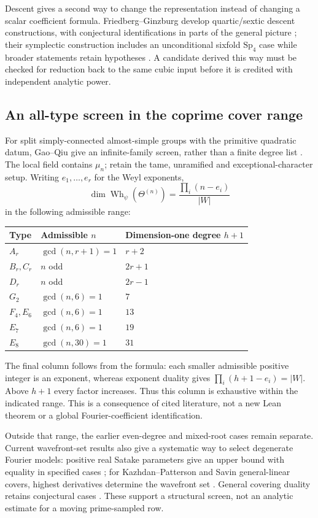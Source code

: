 \documentclass[11pt]{article}
\newcommand{\toprule}{\hline}
\newcommand{\midrule}{\hline}
\newcommand{\bottomrule}{\hline}
\newcommand{\Sp}{\mathrm{Sp}}
\begin{document}
Descent gives a second way to change the representation instead of
changing a scalar coefficient formula. Friedberg--Ginzburg develop
quartic/sextic descent constructions, with conjectural identifications
in parts of the general picture \cite{FGDescent}; their symplectic
construction includes an unconditional sixfold $\Sp_4$ case while
broader statements retain hypotheses \cite{FGSymplectic}.
A candidate derived this way must be checked for reduction back to the
same cubic input before it is credited with independent analytic power.

\subsection{An all-type screen in the coprime cover range}

For split simply-connected almost-simple groups with the primitive
quadratic datum, Gao--Qiu
give an infinite-family screen, rather than a finite degree list
\cite[Section 3, Table 6, (3.5)]{GaoQiu}. The local field contains
$\mu_n$; retain the tame, unramified and exceptional-character setup.
Writing $e_1,\ldots,e_r$ for the Weyl exponents,
\[
 \dim\operatorname{Wh}_{\psi}(\Theta^{(n)})
   =\frac{\prod_i(n-e_i)}{|W|}
\]
in the following admissible range:
\begin{center}
\begin{tabular}{lll}
\toprule
Type & Admissible $n$ & Dimension-one degree $h+1$\\
\midrule
$A_r$ & $\gcd(n,r+1)=1$ & $r+2$\\
$B_r,C_r$ & $n$ odd & $2r+1$\\
$D_r$ & $n$ odd & $2r-1$\\
$G_2$ & $\gcd(n,6)=1$ & $7$\\
$F_4,E_6$ & $\gcd(n,6)=1$ & $13$\\
$E_7$ & $\gcd(n,6)=1$ & $19$\\
$E_8$ & $\gcd(n,30)=1$ & $31$\\
\bottomrule
\end{tabular}
\end{center}
The final column follows from the formula: each smaller admissible
positive integer is an exponent, whereas exponent duality gives
$\prod_i(h+1-e_i)=|W|$. Above $h+1$ every factor increases.
Thus this column is exhaustive within the indicated range.
This is a consequence of cited literature, not a new Lean theorem
or a global Fourier-coefficient identification.

Outside that range, the earlier even-degree and mixed-root cases
remain separate. Current wavefront-set results also give a systematic
way to select degenerate Fourier models: positive real Satake
parameters give an upper bound with equality in specified cases
\cite{GaoWangWavefront}; for Kazhdan--Patterson and Savin general-linear
covers, highest derivatives determine the wavefront set
\cite{GaoWangZouWavefront}. General covering duality retains conjectural
cases \cite{CoveringBV}. These support a structural screen, not an
analytic estimate for a moving prime-sampled row.
\end{document}
